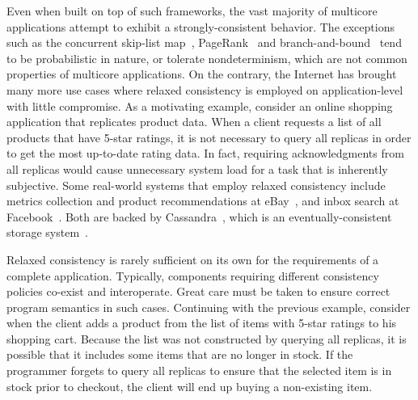 \documentclass[]{usiinfprospectus}
\begin{document}
Even when built on top of such frameworks, the vast majority of multicore applications attempt to exhibit a strongly-consistent behavior. The exceptions such as the concurrent skip-list map~\cite{concurrentskiplistmap}, PageRank~\cite{mcsherry2005uniform} and branch-and-bound~\cite{clausen1999branch} tend to be probabilistic in nature, or tolerate nondeterminism, which are not common properties of multicore applications. On the contrary, the Internet has brought many more use cases where relaxed consistency is employed on application-level with little compromise. As a motivating example, consider an online shopping application that replicates product data. When a client requests a list of all products that have 5-star ratings, it is not necessary to query all replicas in order to get the most up-to-date rating data. In fact, requiring acknowledgments from all replicas would cause unnecessary system load for a task that is inherently subjective. Some real-world systems that employ relaxed consistency include metrics collection and product recommendations at eBay~\cite{cassandraebay}, and inbox search at Facebook~\cite{lakshman2010cassandra}. Both are backed by Cassandra~\cite{lakshman2010cassandra}, which is an eventually-consistent storage system~\cite{vogels2009eventually}.








Relaxed consistency is rarely sufficient on its own for the requirements of a complete application. Typically, components requiring different consistency policies co-exist and interoperate. Great care must be taken to ensure correct program semantics in such cases. Continuing with the previous example, consider  when the client adds a product from the list of items with 5-star ratings to his shopping cart. Because the list was not constructed by querying all replicas, it is possible that it includes some items that are no longer in stock. If the programmer forgets to query all replicas to ensure that the selected item is in stock prior to checkout, the client will end up buying a non-existing item.
\end{document}
